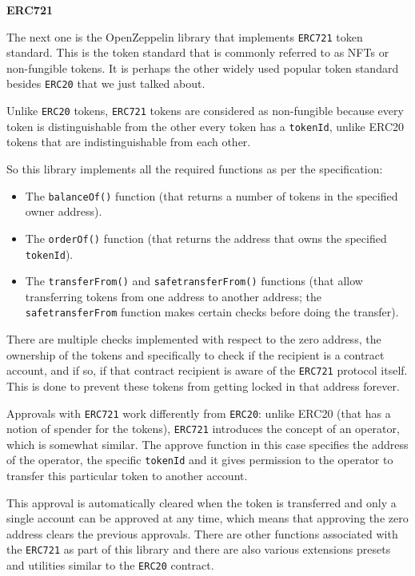 \textbf{ERC721}

The next one is the OpenZeppelin library that implements \texttt{ERC721}
token standard. This is the token standard that is commonly referred to
as NFTs or non-fungible tokens. It is perhaps the other widely used
popular token standard besides \texttt{ERC20} that we just talked about.

Unlike \texttt{ERC20} tokens, \texttt{ERC721} tokens are considered as
non-fungible because every token is distinguishable from the other every
token has a \texttt{tokenId}, unlike ERC20 tokens that are
indistinguishable from each other.

So this library implements all the required functions as per the
specification:

\begin{itemize}
\tightlist
\item
  The \texttt{balanceOf()} function (that returns a number of tokens in
  the specified owner address).
\item
  The \texttt{orderOf()} function (that returns the address that owns
  the specified \texttt{tokenId}).
\item
  The \texttt{transferFrom()} and \texttt{safetransferFrom()} functions
  (that allow transferring tokens from one address to another address;
  the \texttt{safetransferFrom} function makes certain checks before
  doing the transfer).
\end{itemize}

There are multiple checks implemented with respect to the zero address,
the ownership of the tokens and specifically to check if the recipient
is a contract account, and if so, if that contract recipient is aware of
the \texttt{ERC721} protocol itself. This is done to prevent these
tokens from getting locked in that address forever.

Approvals with \texttt{ERC721} work differently from \texttt{ERC20}:
unlike ERC20 (that has a notion of spender for the tokens),
\texttt{ERC721} introduces the concept of an operator, which is somewhat
similar. The approve function in this case specifies the address of the
operator, the specific \texttt{tokenId} and it gives permission to the
operator to transfer this particular token to another account.

This approval is automatically cleared when the token is transferred and
only a single account can be approved at any time, which means that
approving the zero address clears the previous approvals. There are
other functions associated with the \texttt{ERC721} as part of this
library and there are also various extensions presets and utilities
similar to the \texttt{ERC20} contract.

